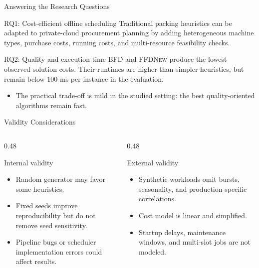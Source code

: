 \documentclass[aspectratio=169,10pt]{beamer}
\newcommand{\alg}[1]{\textsc{#1}}
\begin{document}
\begin{frame}{Answering the Research Questions}
  \begin{block}{RQ1: Cost-efficient offline scheduling}
    Traditional packing heuristics can be adapted to private-cloud procurement planning by adding heterogeneous machine types, purchase costs, running costs, and multi-resource feasibility checks.
  \end{block}
  \begin{block}{RQ2: Quality and execution time}
    \alg{BFD} and \alg{FFDNew} produce the lowest observed solution costs. Their runtimes are higher than simpler heuristics, but remain below 100 ms per instance in the evaluation.
  \end{block}
  \vspace{0.15cm}
  \begin{itemize}
    \item The practical trade-off is mild in the studied setting: the best quality-oriented algorithms remain fast.
  \end{itemize}
\end{frame}

\begin{frame}{Validity Considerations}
  \begin{columns}[T,totalwidth=\textwidth]
    \begin{column}{0.48\textwidth}
      \begin{block}{Internal validity}
        \begin{itemize}
          \item Random generator may favor some heuristics.
          \item Fixed seeds improve reproducibility but do not remove seed sensitivity.
          \item Pipeline bugs or scheduler implementation errors could affect results.
        \end{itemize}
      \end{block}
    \end{column}
    \begin{column}{0.48\textwidth}
      \begin{block}{External validity}
        \begin{itemize}
          \item Synthetic workloads omit bursts, seasonality, and production-specific correlations.
          \item Cost model is linear and simplified.
          \item Startup delays, maintenance windows, and multi-slot jobs are not modeled.
        \end{itemize}
      \end{block}
    \end{column}
  \end{columns}
\end{frame}
\end{document}
